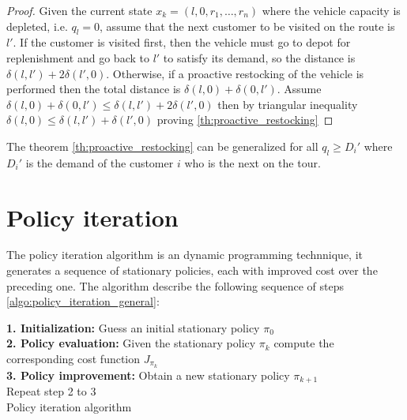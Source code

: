 \begin{proof}
Given the current state $x_k=(l,0,r_1,\ldots, r_n)$ where the vehicle capacity is depleted, i.e. $q_l = 0$, assume that the next customer to be visited on the route is $l'$. If the customer is visited first, then the vehicle must go to depot for replenishment and go back to $l'$ to satisfy its demand, so the distance is $\delta(l,l')+2\delta(l',0)$. Otherwise, if a proactive restocking of the vehicle is performed then the total distance is $\delta(l,0)+\delta(0,l')$.
Assume $\delta(l,0)+\delta(0,l') \leq \delta(l,l')+2\delta(l',0)$ then by triangular inequality $\delta(l,0) \leq \delta(l,l')+\delta(l',0)$ proving \ref{th:proactive_restocking}
\end{proof}

\begin{lemma}%
 The theorem \ref{th:proactive_restocking} can be generalized for all $q_l \geq D_i'$ where $D_i'$ is the demand of the customer $i$ who is the next on the tour.
\end{lemma}











\section{Policy iteration}

The policy iteration algorithm is an dynamic programming technnique, it generates a sequence of stationary policies, each with improved cost over the preceding one. The algorithm describe the following sequence of steps \ref{algo:policy_iteration_general}:

\begin{algorithm}
 \textbf{1. Initialization:} Guess an initial stationary policy $\pi_0$\\
 \textbf{2. Policy evaluation:} Given the stationary policy $\pi_k$ compute the corresponding cost function $J_{\pi_k}$\\
 \textbf{3. Policy improvement:} Obtain a new stationary policy $\pi_{k+1}$\\
 Repeat step 2 to 3\\
 \caption{Policy iteration algorithm}\label{algo:policy_iteration_general}
\end{algorithm}

